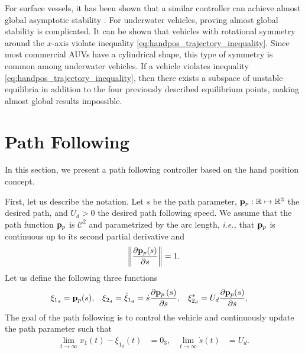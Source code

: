 \begin{rmk}
    For surface vessels, it has been shown that a similar controller can achieve almost global asymptotic stability \cite{paliotta_trajectory_2019}.
    For underwater vehicles, proving almost global stability is complicated.
    It can be shown that vehicles with rotational symmetry around the $x$-axis violate inequality \eqref{eq:handpos_trajectory_inequality}.
    Since most commercial AUVs have a cylindrical shape, this type of symmetry is common among underwater vehicles.
    If a vehicle violates inequality \eqref{eq:handpos_trajectory_inequality}, then there exists a subspace of unstable equilibria in addition to the four previously described equilibrium points, making almost global results impossible.
\end{rmk}

\section{Path Following}
\label{sec:handpos_trajectory_path_following}
In this section, we present a path following controller based on the hand position concept.

First, let us describe the notation.
Let $s$ be the path parameter, $\mathbf{p}_p: \mathbb{R} \mapsto \mathbb{R}^{3}$ the desired path, and $U_d > 0$ the desired path following speed.
We assume that the path function $\mathbf{p}_p$ is $\mathcal{C}^2$ and parametrized by the arc length, \emph{i.e.,} that $\mathbf{p}_p$ is continuous up to its second partial derivative and
\begin{equation}
    \left\|\frac{\partial \mathbf{p}_p(s)}{\partial s}\right\| = 1.
\end{equation}
Let us define the following three functions
\begin{align}
    \xi_{1_d} &= \mathbf{p}_p(s), &
    \xi_{2_d} &= \dot{\xi}_{1_d} = \dot{s}\frac{\partial \mathbf{p}_p\left(s\right)}{\partial s}, &
    \xi_{2_d}^{*} &= U_d \frac{\partial \mathbf{p}_p(s)}{\partial s},
\end{align}
The goal of the path following is to control the vehicle and continuously update the path parameter such that
\begin{align}
    \lim_{t \rightarrow \infty} x_1(t) - \xi_{1_d}(t) &= 0_3, &
    \lim_{t \rightarrow \infty} \dot{s}(t) &= U_d. \label{eq:handpos_trajectory_control_goal_path}
\end{align}

